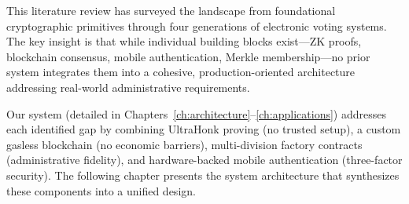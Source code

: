 This literature review has surveyed the landscape from foundational cryptographic primitives through four generations of electronic voting systems. The key insight is that while individual building blocks exist---ZK proofs, blockchain consensus, mobile authentication, Merkle membership---no prior system integrates them into a cohesive, production-oriented architecture addressing real-world administrative requirements.

Our system (detailed in Chapters~\ref{ch:architecture}--\ref{ch:applications}) addresses each identified gap by combining UltraHonk proving (no trusted setup), a custom gasless blockchain (no economic barriers), multi-division factory contracts (administrative fidelity), and hardware-backed mobile authentication (three-factor security). The following chapter presents the system architecture that synthesizes these components into a unified design.
